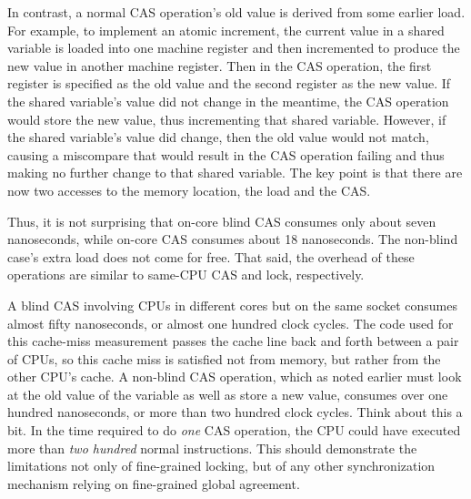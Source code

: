In contrast, a normal CAS operation's old value is derived from
some earlier load.
For example, to implement an atomic increment, the current value in
a shared variable is loaded into one machine register and then incremented
to produce the new value in another machine register.
Then in the CAS operation, the first register is specified as the old
value and the second register as the new value.
If the shared variable's value did not change in the meantime, the
CAS operation would store the new value, thus incrementing that shared
variable.
However, if the shared variable's value did change, then the old value
would not match, causing a miscompare that would result in the CAS
operation failing and thus making no further change to that shared
variable.
The key point is that there are now two accesses to the memory location,
the load and the CAS\@.

Thus, it is not surprising that on-core blind CAS consumes only about
seven nanoseconds, while on-core CAS consumes about 18 nanoseconds.
The non-blind case's extra load does not come for free.
That said, the overhead of these operations are similar to same-CPU
CAS and lock, respectively.

\QuickQuizEnd

A blind CAS involving CPUs in different cores but on the same socket
consumes almost fifty nanoseconds, or almost one hundred clock cycles.
The code used for this cache-miss measurement passes the cache line
back and forth between a pair of CPUs, so this cache miss is satisfied
not from memory, but rather from the other CPU's cache.
A non-blind CAS operation, which as noted earlier must look at the old
value of the variable as well as store a new value, consumes over one
hundred nanoseconds, or more than two hundred clock cycles.
Think about this a bit.
In the time required to do \emph{one} CAS operation, the CPU could have
executed more than \emph{two hundred} normal instructions.
This should demonstrate the limitations not only of fine-grained locking,
but of any other synchronization mechanism relying on fine-grained
global agreement.

